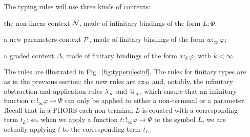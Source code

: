 The typing rules will use three kinds of contexts:
\begin{varitemize}
\item the non-linear context $\mathcal{N}$, made of infinitary bindings of the form $L:\Phi$;
\item a new parameters context $\mathcal{P}$, made of finitary bindings of the form $w:_\infty \varphi$;
\item a graded context $\Delta$, made of finitary bindings of the form $x:_k \varphi$, with $k<\infty$.
\end{varitemize}
The rules are illustrated in Fig.~\ref{fig:typerulesinf}.
The rules for finitary types are as in the previous section; the new rules are
ax$_{\mathcal{P}}$ and, notably, the infinitary abstraction and application rules $\lambda_\infty$ and $@_\infty$, which ensure that an infinitary function $t:!_\infty\varphi\multimap\Psi$ can only be applied to either a non-terminal or a parameter. 
Recall that in a PHORS each non-terminal $L$ is equated with a corresponding term $t_L$: so, when we apply a function $t:!_\infty \varphi\to \Psi$ to the symbol $L$, we are actually applying $t$ to the corresponding term $t_L$.



